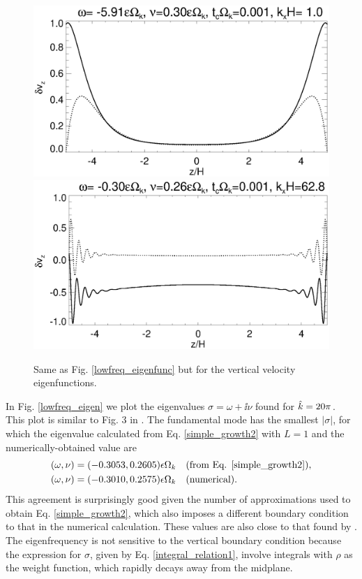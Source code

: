 \begin{figure}
  \includegraphics[width=\linewidth,clip=true,trim=0cm 1.75cm 0cm
  0cm]{figures/eigenvectorvz_iso_kx1} 
  \includegraphics[width=\linewidth]{figures/eigenvectorvz_iso_kx60}
  \caption{Same as Fig. \ref{lowfreq_eigenfunc} but for the vertical
    velocity eigenfunctions.
    \label{lowfreq_eigenfuncvz}
  }
\end{figure}

In Fig. \ref{lowfreq_eigen} we plot the eigenvalues 
$\sigma = \omega + \ii\nu$ found for $\hat{k}=20\pi$. This plot is
similar to Fig. 3 in \cite{mcnally14}. The fundamental mode has the
smallest $|\sigma|$, for which the eigenvalue calculated from
Eq. \ref{simple_growth2} with $L=1$ and the numerically-obtained value are   
\begin{align*}
  (\omega,\nu) = (-0.3053,0.2605)\epsilon\Omega_k &\quad \text{(from
    Eq. \ref{simple_growth2})},\\
  (\omega,\nu) = (-0.3010,0.2575) \epsilon \Omega_k &\quad \text{(numerical)}.
\end{align*}
This agreement is surprisingly good given the number of approximations
used to obtain Eq. \ref{simple_growth2}, which also imposes a different
boundary condition to that in the numerical calculation. These values
are also close to that found by \cite{mcnally14}. The eigenfrequency
is not sensitive to the vertical boundary condition because the
expression for $\sigma$, given by Eq. \ref{integral_relation1},
involve integrals with $\rho$ as the   weight function, which rapidly
decays away from the midplane. 

